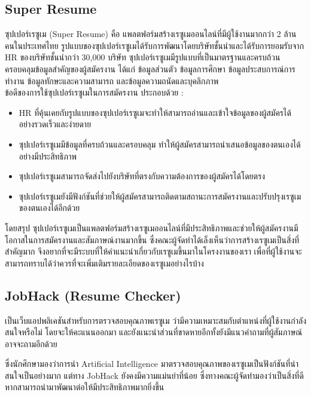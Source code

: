 \subsection{Super Resume}
ซุปเปอร์เรซูเม (Super Resume) คือ แพลตฟอร์มสร้างเรซูเมออนไลน์ที่มีผู้ใช้งานมากกว่า 2 ล้านคนในประเทศไทย 
รูปแบบของซุปเปอร์เรซูเมได้รับการพัฒนาโดยบริษัทชั้นนำและได้รับการยอมรับจาก HR ของบริษัทชั้นนำกว่า 30,000 บริษัท ซุปเปอร์เรซูเมมีรูปแบบที่เป็นมาตรฐานและครบถ้วน 
ครอบคลุมข้อมูลสำคัญของผู้สมัครงาน ได้แก่ ข้อมูลส่วนตัว ข้อมูลการศึกษา ข้อมูลประสบการณ์การทำงาน ข้อมูลทักษะและความสามารถ และข้อมูลความถนัดและบุคลิกภาพ \\
ข้อดีของการใช้ซุปเปอร์เรซูเมในการสมัครงาน ประกอบด้วย :
\begin{itemize}
    \item HR ที่คุ้นเคยกับรูปแบบของซุปเปอร์เรซูเมจะทำให้สามารถอ่านและเข้าใจข้อมูลของผู้สมัครได้อย่างรวดเร็วและง่ายดาย
    \item ซุปเปอร์เรซูเมมีข้อมูลที่ครบถ้วนและครอบคลุม ทำให้ผู้สมัครสามารถนำเสนอข้อมูลของตนเองได้อย่างมีประสิทธิภาพ
    \item ซุปเปอร์เรซูเมสามารถจัดส่งไปยังบริษัทที่ตรงกับความต้องการของผู้สมัครได้โดยตรง
    \item ซุปเปอร์เรซูเมยังมีฟังก์ชันที่ช่วยให้ผู้สมัครสามารถติดตามสถานะการสมัครงานและปรับปรุงเรซูเมของตนเองได้อีกด้วย
\end{itemize}
\par โดยสรุป ซุปเปอร์เรซูเมเป็นแพลตฟอร์มสร้างเรซูเมออนไลน์ที่มีประสิทธิภาพและช่วยให้ผู้สมัครงานมีโอกาสในการสมัครงานและสัมภาษณ์งานมากขึ้น 
ซึ่งคณะผู้จัดทำได้เล็งเห็นว่าการสร้างเรซูเมเป็นสิ่งที่สำคัญมาก จึงอยากที่จะมีระบบที่ให้คำแนะนำเกี่ยวกับเรซูเมขึ้นมาในโครงงานของเรา 
เพื่อที่ผู้ใช้งานจะสามารถทราบได้ว่าควรที่จะเพิ่มเติมรายละเอียดของเรซูเมอย่างไรบ้าง

\subsection{JobHack (Resume Checker)}
เป็นเว็บแอปพลิเคชันสำหรับการตรวจสอบคุณภาพเรซูเม ว่ามีความเหมาะสมกับตำแหน่งที่ผู้ใช้งานกำลังสนใจหรือไม่ โดยจะให้คะแนนออกมา 
และยังแนะนำส่วนที่ขาดหายอีกทั้งยังมีแนวคำถามที่ผู้สัมภาษณ์อาจจะถามอีกด้วย 
\par ซึ่งนักศึกษามองว่าการนำ Artificial Intelligence มาตรวจสอบคุณภาพของเรซูเมเป็นฟังก์ชันที่น่าสนใจเป็นอย่างมาก แต่ทาง JobHack 
ยังคงมีความแม่นยำที่น้อย ซึ่งทางคณะผู้จัดทำมองว่าเป็นสิ่งที่ดีหากสามารถนำมาพัฒนาต่อให้มีประสิทธิภาพมากยิ่งขึ้น

